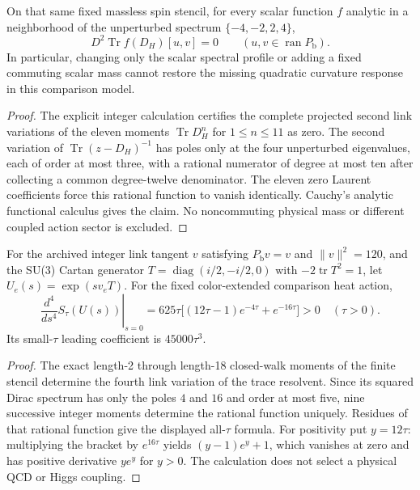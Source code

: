 \documentclass[12pt,a4paper]{article}
\begin{document}
\begin{corollary}
\label{p13:cor:s3-analytic-profile-blind-v159}
On that same fixed massless spin stencil, for every scalar function
$f$ analytic in a neighborhood of the unperturbed spectrum
$\{-4,-2,2,4\}$,
\[
\boxed{D^2\operatorname{Tr}f(D_H)[u,v]=0
\qquad (u,v\in\operatorname{ran}P_{\mathrm b}).}
\]
In particular, changing only the scalar spectral profile or adding
a fixed commuting scalar mass cannot restore the missing quadratic
curvature response in this comparison model.
\end{corollary}
\begin{proof}
The explicit integer calculation certifies the complete projected
second link variations of the eleven moments
$\operatorname{Tr}D_H^n$ for $1\le n\le11$ as zero.
The second variation of $\operatorname{Tr}(z-D_H)^{-1}$ has poles only
at the four unperturbed eigenvalues, each of order at most three,
with a rational numerator of degree at most ten after collecting
a common degree-twelve denominator.  The eleven zero Laurent
coefficients force this rational function to vanish identically.
Cauchy's analytic functional calculus gives the claim.
No noncommuting physical mass or different coupled action sector is
excluded.
\end{proof}

\begin{proposition}
\label{p13:prop:s3-blind-quartic-v159}
For the archived integer link tangent $v$ satisfying
$P_{\mathrm b}v=v$ and $\|v\|^2=120$, and the SU(3)
Cartan generator $T=\operatorname{diag}(i/2,-i/2,0)$ with
$-2\operatorname{tr}T^2=1$, let
$U_e(s)=\exp(sv_eT)$.
For the fixed color-extended comparison heat action,
\[
\boxed{\left.\frac{d^4}{ds^4}S_\tau(U(s))\right|_{s=0}
=625\tau\bigl[(12\tau-1)e^{-4\tau}+e^{-16\tau}\bigr]>0
\quad(\tau>0).}
\]
Its small-$\tau$ leading coefficient is $45000\tau^3$.
\end{proposition}
\begin{proof}
The exact length-2 through length-18 closed-walk moments of the
finite stencil determine the fourth link variation of the trace
resolvent. Since its squared Dirac spectrum has only the poles
$4$ and $16$ and order at most five, nine successive integer
moments determine the rational function uniquely.  Residues of
that rational function give the displayed all-$\tau$ formula.
For positivity put $y=12\tau$: multiplying the bracket by
$e^{16\tau}$ yields $(y-1)e^y+1$, which vanishes at zero and has
positive derivative $ye^y$ for $y>0$.
The calculation does not select a physical QCD or Higgs coupling.
\end{proof}
\end{document}
